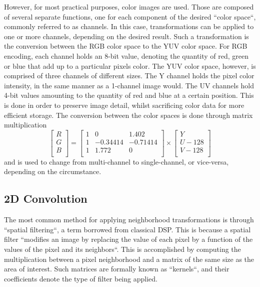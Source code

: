 However, for most practical purposes, color images are used. Those are composed of several separate functions,
one for each component of the desired ``color space``, commonly referred to as channels. In this case,
transformations can be applied to one or more channels, depending on the desired result. Such a transformation
is the conversion between the RGB color space to the YUV color space. For RGB encoding, each channel holds
an 8-bit value, denoting the quantity of red, green or blue that add up to a particular pixels color. The YUV
color space, however, is comprised of three channels of different sizes. The Y channel holds the pixel color
intensity, in the same manner as a 1-channel image would. The UV channels hold 4-bit values amounting to the
quantity of red and blue at a certain position. This is done in order to preserve image detail, whilst
sacrificing color data for more efficient storage. The conversion between the color spaces is done through
matrix multiplication \cite{rgb2yuv}
\[
	\begin{bmatrix}
		R \\
		G \\
		B \\
	\end{bmatrix}
	=
	\begin{bmatrix}
		1 & 0        & 1.402    \\
		1 & -0.34414 & -0.71414 \\
		1 & 1.772    & 0        \\
	\end{bmatrix}
	\times
	\begin{bmatrix}
		Y       \\
		U - 128 \\
		V - 128 \\
	\end{bmatrix}
\]
and is used to change from multi-channel to single-channel, or vice-versa, depending on the circumstance.
\cite{rgb2yuv}

\subsection{2D Convolution}

The most common method for applying neighborhood transformations is through ``spatial filtering``, a term
borrowed from classical DSP. This is because a spatial filter ``modifies an image by replacing the value
of each pixel by a function of the values of the pixel and its neighbors``. This is accomplished by computing
the multiplication between a pixel neighborhood and a matrix of the same size as the area of interest. Such
matrices are formally known as ``kernels``, and their coefficients denote the type of filter being applied.
\cite{dipBook}

